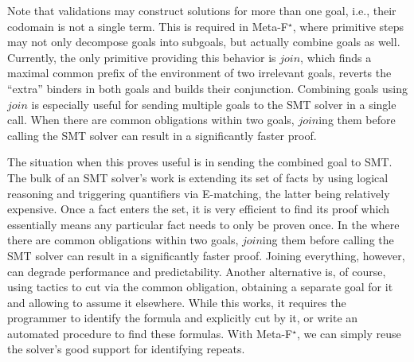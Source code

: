 \documentclass[runningheads]{llncs}
\newcommand{\kw}[1]{\text{\ls|#1|}}
\newcommand\metafstar{Meta-F$^\star$\xspace}
\newcommand{\comm}[3]{\ifcheckpagebudget\else\ifdraft{{\color{#1}[#2: #3]}}\fi\fi}
\newcommand{\ch}[1]{\comm{teal}{CH}{#1}}
\newcommand{\guido}[1]{\comm{blue}{Guido}{#1}}
\begin{document}
%


Note that
validations may construct solutions for more than one goal, i.e.,
their codomain is not a single term.
%
This is required in \metafstar, where primitive steps may not only
decompose goals into subgoals, but actually combine goals as well.
%
Currently, the only primitive providing this behavior is \ls$join$,
which finds a maximal common prefix of the environment of two
irrelevant goals, reverts the ``extra'' binders in both goals and
builds their conjunction.
%
Combining goals using \ls$join$ is especially useful for
sending multiple goals to the SMT solver in a single call.
%
When there are common obligations within two goals, \ls$join$ing them
before calling the SMT solver can result in a significantly faster
proof.

\iffull
The situation when this proves useful is in sending the combined goal to
SMT.
%
The bulk of an SMT solver's work is extending its set of facts
by using logical reasoning and triggering quantifiers via E-matching,
the latter being relatively expensive.
%
Once a fact enters the set, it is very efficient to find its
proof\guido{proof? yikes} which essentially means any particular fact
needs to only be proven once.
%
In the where there are common obligations within two goals, \ls$join$ing
them before calling the SMT solver can result in a significantly faster
proof.
%
Joining everything, however, can degrade performance and predictability.
%
Another alternative is, of course, using tactics to cut via the common
obligation, obtaining a separate goal for it and allowing to assume it
elsewhere.
%
While this works, it requires the programmer to identify the formula
and explicitly cut by it, or write an automated procedure to find these
formulas.
%
With \metafstar, we can simply reuse the solver's good support for
identifying repeats.
\fi
\end{document}
